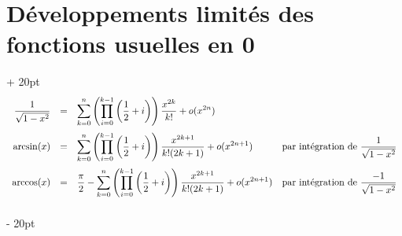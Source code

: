 \documentclass[a4paper, 12pt, twoside]{article}
\newcommand{\lr}[1]{\left( #1 \right)}
\newcommand{\ind}[1][20pt]{\advance\leftskip + #1}
\newcommand{\deind}[1][20pt]{\advance\leftskip - #1}
\newenvironment{indt}[2][20pt]{#2 \par \ind[#1]}{\par \deind} %
\begin{document}
\begin{indt}{\section{Développements limités des fonctions usuelles en 0}}
\[\begin{array}{rcll}
                \dfrac{1}{\sqrt{1 - x^2}} &=& \displaystyle \sum_{k = 0}^n \lr{\prod_{i = 0}^{k - 1} \lr{\dfrac 1 2 + i}} \dfrac{x^{2k}}{k!} + o(x^{2n})
                \vspace{6pt}
                \\
                \arcsin(x) &=& \displaystyle \sum_{k = 0}^n \lr{\prod_{i = 0}^{k - 1} \lr{\dfrac 1 2 + i}} \dfrac{x^{2k + 1}}{k!(2k + 1)} + o(x^{2n + 1})
                & \text{par intégration de $\dfrac{1}{\sqrt{1 - x^2}}$}
                \vspace{6pt}
                \\
                \arccos(x) &=& \displaystyle \dfrac \pi 2 -\sum_{k = 0}^n \lr{\prod_{i = 0}^{k - 1} \lr{\dfrac 1 2 + i}} \dfrac{x^{2k + 1}}{k!(2k + 1)} + o(x^{2n + 1})
                & \text{par intégration de $\dfrac{-1}{\sqrt{1 - x^2}}$}
                \vspace{6pt}
                \\
            \end{array}
        \]
        
    \end{indt}
    
    \vspace{12pt}
    
\end{document}
